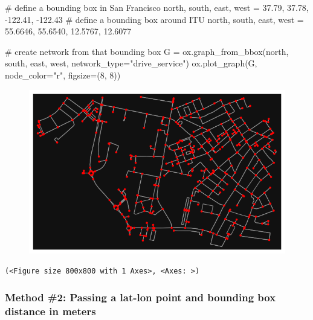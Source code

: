 \documentclass[
  letterpaper,
  DIV=11,
  numbers=noendperiod]{scrreprt}
\newenvironment{Shaded}{\begin{snugshade}}{\end{snugshade}}
\newcommand{\CommentTok}[1]{\textcolor[rgb]{0.37,0.37,0.37}{#1}}
\newcommand{\DecValTok}[1]{\textcolor[rgb]{0.68,0.00,0.00}{#1}}
\newcommand{\FloatTok}[1]{\textcolor[rgb]{0.68,0.00,0.00}{#1}}
\newcommand{\NormalTok}[1]{\textcolor[rgb]{0.00,0.23,0.31}{#1}}
\newcommand{\OperatorTok}[1]{\textcolor[rgb]{0.37,0.37,0.37}{#1}}
\newcommand{\StringTok}[1]{\textcolor[rgb]{0.13,0.47,0.30}{#1}}
\begin{document}
\begin{Shaded}
\begin{Highlighting}[]
\CommentTok{\# define a bounding box in San Francisco}
\NormalTok{north, south, east, west }\OperatorTok{=} \FloatTok{37.79}\NormalTok{, }\FloatTok{37.78}\NormalTok{, }\OperatorTok{{-}}\FloatTok{122.41}\NormalTok{, }\OperatorTok{{-}}\FloatTok{122.43}
\CommentTok{\# define a bounding box around ITU}
\NormalTok{north, south, east, west }\OperatorTok{=} \FloatTok{55.6646}\NormalTok{, }\FloatTok{55.6540}\NormalTok{, }\FloatTok{12.5767}\NormalTok{, }\FloatTok{12.6077}

\CommentTok{\# create network from that bounding box}
\NormalTok{G }\OperatorTok{=}\NormalTok{ ox.graph\_from\_bbox(north, south, east, west, network\_type}\OperatorTok{=}\StringTok{"drive\_service"}\NormalTok{)}
\NormalTok{ox.plot\_graph(G, node\_color}\OperatorTok{=}\StringTok{"r"}\NormalTok{, figsize}\OperatorTok{=}\NormalTok{(}\DecValTok{8}\NormalTok{, }\DecValTok{8}\NormalTok{))}
\end{Highlighting}
\end{Shaded}

\begin{figure}[H]

{\centering \includegraphics{labs/w07_OSM_files/figure-pdf/cell-6-output-1.png}

}

\end{figure}

\begin{verbatim}
(<Figure size 800x800 with 1 Axes>, <Axes: >)
\end{verbatim}

\hypertarget{method-2-passing-a-lat-lon-point-and-bounding-box-distance-in-meters}{%
\subsubsection{Method \#2: Passing a lat-lon point and bounding box
distance in
meters}\label{method-2-passing-a-lat-lon-point-and-bounding-box-distance-in-meters}}
\end{document}
